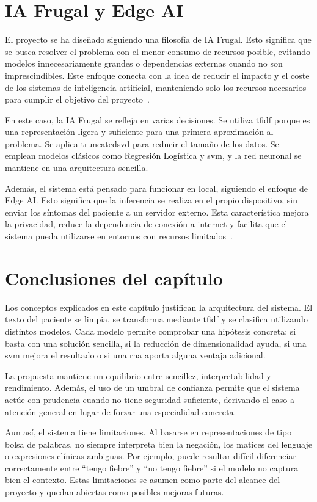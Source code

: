 \section{IA Frugal y Edge AI}

El proyecto se ha diseñado siguiendo una filosofía de IA Frugal. Esto significa que se busca resolver el problema con el menor consumo de recursos posible, evitando modelos innecesariamente grandes o dependencias externas cuando no son imprescindibles. Este enfoque conecta con la idea de reducir el impacto y el coste de los sistemas de inteligencia artificial, manteniendo solo los recursos necesarios para cumplir el objetivo del proyecto~\cite{greenai_es}.

En este caso, la IA Frugal se refleja en varias decisiones. Se utiliza \gls{tfidf} porque es una representación ligera y suficiente para una primera aproximación al problema. Se aplica \gls{truncatedsvd} para reducir el tamaño de los datos. Se emplean modelos clásicos como Regresión Logística y \gls{svm}, y la red neuronal se mantiene en una arquitectura sencilla.

Además, el sistema está pensado para funcionar en local, siguiendo el enfoque de Edge AI. Esto significa que la inferencia se realiza en el propio dispositivo, sin enviar los síntomas del paciente a un servidor externo. Esta característica mejora la privacidad, reduce la dependencia de conexión a internet y facilita que el sistema pueda utilizarse en entornos con recursos limitados~\cite{ibm_edge_ai}.

\section{Conclusiones del capítulo}

Los conceptos explicados en este capítulo justifican la arquitectura del sistema. El texto del paciente se limpia, se transforma mediante \gls{tfidf} y se clasifica utilizando distintos modelos. Cada modelo permite comprobar una hipótesis concreta: si basta con una solución sencilla, si la reducción de dimensionalidad ayuda, si una \gls{svm} mejora el resultado o si una \gls{rna} aporta alguna ventaja adicional.

La propuesta mantiene un equilibrio entre sencillez, interpretabilidad y rendimiento. Además, el uso de un umbral de confianza permite que el sistema actúe con prudencia cuando no tiene seguridad suficiente, derivando el caso a atención general en lugar de forzar una especialidad concreta.

Aun así, el sistema tiene limitaciones. Al basarse en representaciones de tipo bolsa de palabras, no siempre interpreta bien la negación, los matices del lenguaje o expresiones clínicas ambiguas. Por ejemplo, puede resultar difícil diferenciar correctamente entre ``tengo fiebre'' y ``no tengo fiebre'' si el modelo no captura bien el contexto. Estas limitaciones se asumen como parte del alcance del proyecto y quedan abiertas como posibles mejoras futuras.
